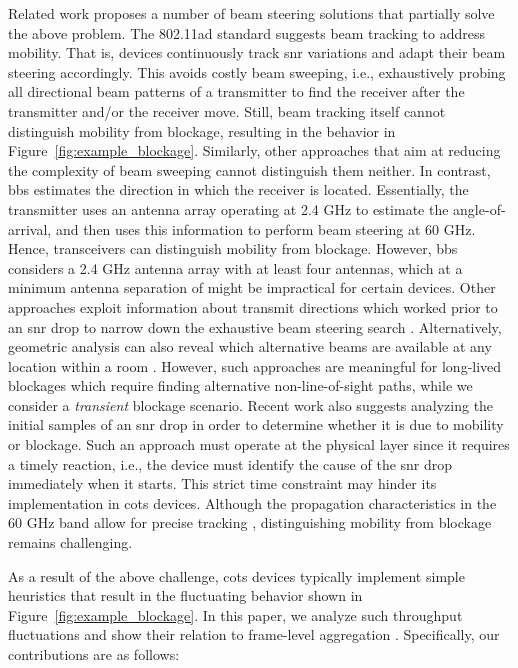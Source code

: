 \documentclass{article}
\begin{document}
Related work proposes a number of beam steering solutions that partially solve the above problem. The 802.11ad standard suggests beam tracking to address mobility. That is, devices continuously track \ac{snr} variations and adapt their beam steering accordingly. This avoids costly beam sweeping, i.e., exhaustively probing all directional beam patterns of a transmitter to find the receiver after the transmitter and/or the receiver move. Still, beam tracking itself cannot distinguish mobility from blockage, resulting in the behavior in Figure~\ref{fig:example_blockage}. Similarly, other approaches that aim at reducing the complexity of beam sweeping \cite{opt_beam_sweep} cannot distinguish them neither. In contrast, \ac{bbs} \cite{bbs} estimates the direction in which the receiver is located. Essentially, the transmitter uses an antenna array operating at 2.4 GHz to estimate the angle-of-arrival, and then uses this information to perform beam steering at 60 GHz. Hence, transceivers can distinguish mobility from blockage. However, \ac{bbs} considers a 2.4 GHz antenna array with at least four antennas, which at a minimum antenna separation of  might be impractical for certain devices. Other approaches exploit information about transmit directions which worked prior to an \ac{snr} drop to narrow down the exhaustive beam steering search \cite{mobiwac}. Alternatively, geometric analysis can also reveal which alternative beams are available at any location within a room \cite{beamscope}. However, such approaches are meaningful for long-lived blockages which require finding alternative non-line-of-sight paths, while we consider a \emph{transient} blockage scenario. Recent work \cite{wimi} also suggests analyzing the initial samples of an \ac{snr} drop in order to determine whether it is due to mobility or blockage. Such an approach must operate at the physical layer since it requires a timely reaction, i.e., the device must identify the cause of the \ac{snr} drop immediately when it starts. This strict time constraint  may hinder its implementation in \ac{cots} devices. Although the propagation characteristics in the 60 GHz band allow for precise tracking \cite{mtrack}, distinguishing mobility from blockage remains challenging.

As a result of the above challenge, \ac{cots} devices typically implement simple heuristics that result in the fluctuating behavior shown in Figure~\ref{fig:example_blockage}. In this paper, we analyze such throughput fluctuations and show their relation to frame-level aggregation \cite{aggregation_overview}. Specifically, our contributions are as follows:
\end{document}
